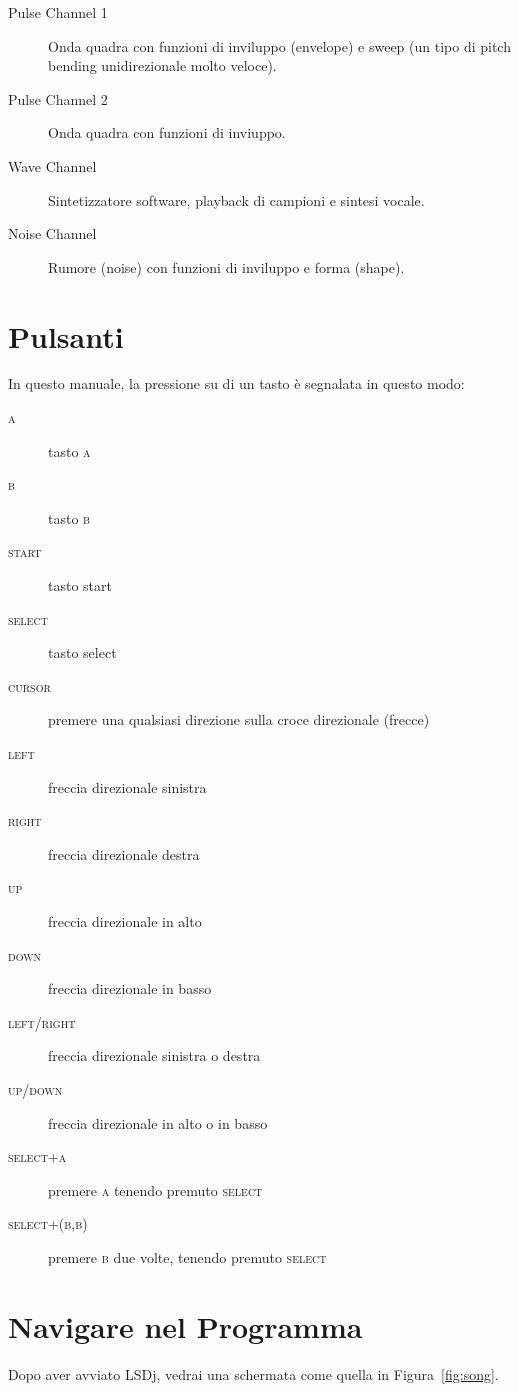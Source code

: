 \begin{description}
\item[Pulse Channel 1] Onda quadra con funzioni di inviluppo (envelope) e sweep (un tipo di pitch bending unidirezionale molto veloce).
\item[Pulse Channel 2] Onda quadra con funzioni di inviuppo.
\item[Wave Channel] Sintetizzatore software, playback di campioni e sintesi vocale.
\item[Noise Channel] Rumore (noise) con funzioni di inviluppo e forma (shape).
\end{description}


\section{Pulsanti}
In questo manuale, la pressione su di un tasto è segnalata in questo modo:
\begin{description}
\item[\textsc{a}] tasto \textsc{a} 
\item[\textsc{b}] tasto \textsc{b} 
\item[\textsc{start}] tasto start
\item[\textsc{select}] tasto select
\item[\textsc{cursor}] premere una qualsiasi direzione sulla croce direzionale (frecce) 
\item[\textsc{left}] freccia direzionale sinistra
\item[\textsc{right}] freccia direzionale destra
\item[\textsc{up}] freccia direzionale in alto
\item[\textsc{down}] freccia direzionale in basso
\item[\textsc{left/right}] freccia direzionale sinistra o destra
\item[\textsc{up/down}] freccia direzionale in alto o in basso
\item[\textsc{select+a}] premere \textsc{a} tenendo premuto \textsc{select}
\item[\textsc{select+(b,b)}] premere \textsc{b} due volte, tenendo premuto \textsc{select}
\end{description}

\section{Navigare nel Programma}
Dopo aver avviato LSDj, vedrai una schermata come quella in Figura~\ref{fig:song}.

